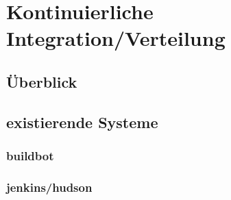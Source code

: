 \section{Kontinuierliche Integration/Verteilung}

\subsection{Überblick}

\subsection{existierende Systeme}

\subsubsection{buildbot}

\subsubsection{jenkins/hudson}
